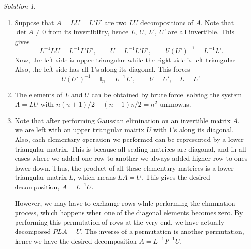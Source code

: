 \documentclass[11pt]{report}
\theoremstyle{remark}
\newtheorem*{solution}{Solution}
\begin{document}
\begin{solution}
        \begin{enumerate}
            \itemsep0em
            \item Suppose that $A = LU = L'U'$ are two $LU$ decompositions of $A$.
            Note that $\det{A} \neq 0$ from its invertibility, hence $L$, $U$, $L'$,
            $U'$ are all invertible. This gives \[
                L^{-1}LU = L^{-1}L'U', \qquad U = L^{-1}L'U', \qquad U(U')^{-1} =
                L^{-1}L'.
            \] Now, the left side is upper triangular while the right side is left
            triangular. Also, the left side has all $1$'s along its diagonal. This
            forces \[
                U(U')^{-1} = \mathbb{I}_n = L^{-1}L', \qquad U = U', \quad L = L'.
            \] 
            
            \item The elements of $L$ and $U$ can be obtained by brute force,
            solving the system $A = LU$ with $n(n + 1) / 2 + (n - 1)n/ 2 = n^2$
            unknowns.

            \item Note that after performing Gaussian elimination on an invertible
            matrix $A$, we are left with an upper triangular matrix $U$ with $1$'s
            along its diagonal. Also, each elementary operation we performed can be
            represented by a lower triangular matrix. This is because all scaling
            matrices are diagonal, and in all cases where we added one row to
            another we always added higher row to ones lower down. Thus, the product
            of all these elementary matrices is a lower triangular matrix $L$, which
            means $LA = U$. This gives the desired decomposition, $A = L^{-1}U$.

            However, we may have to exchange rows while performing the elimination
            process, which happens when one of the diagonal elements becomes zero.
            By performing this permutation of rows at the very end, we have actually
            decomposed $PLA = U$. The inverse of a permutation is another
            permutation, hence we have the desired decomposition $A = L^{-1}P^{-1}U$.
        \end{enumerate}
    \end{solution}
\end{document}
